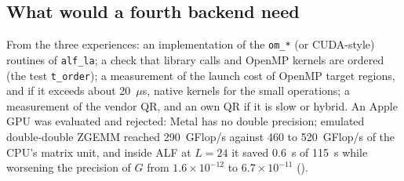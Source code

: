 \subsection{What would a fourth backend need}

From the three experiences: an implementation of the \texttt{om\_*} (or CUDA-style) routines of \texttt{alf\_la}; a check that library calls and OpenMP kernels are ordered (the test \texttt{t\_order}); a measurement of the launch cost of OpenMP target regions, and if it exceeds about 20~$\mu$s, native kernels for the small operations; a measurement of the vendor QR, and an own QR if it is slow or hybrid. An Apple GPU was evaluated and rejected: Metal has no double precision; emulated double-double ZGEMM reached 290~GFlop/s against 460 to 520~GFlop/s of the CPU's matrix unit, and inside ALF at $L=24$ it saved 0.6~s of 115~s while worsening the precision of $G$ from $1.6\times10^{-12}$ to $6.7\times10^{-11}$ (). %
